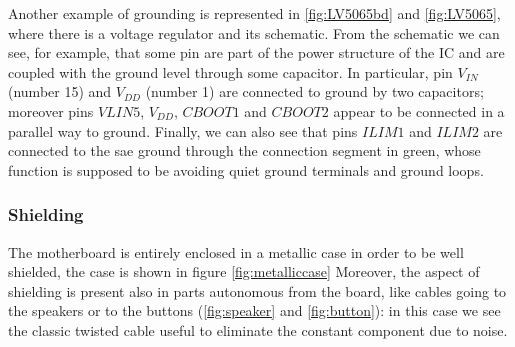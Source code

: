 \documentclass[11pt,a4paper,titlepage]{article}
\begin{document}
      Another example of grounding is represented in \autoref{fig:LV5065bd} and \autoref{fig:LV5065}, where there is a voltage regulator and its schematic. From the schematic we can see, for example, that some pin are part of the power structure of the IC and are coupled with the ground level through some capacitor. In particular, pin $V_{IN}$ (number 15) and $V_{DD}$ (number 1) are connected to ground by two capacitors; moreover pins $VLIN5$, $V_{DD}$, $CBOOT1$ and $CBOOT2$ appear to be connected in a parallel way to ground. Finally, we can also see that pins $ILIM1$ and $ILIM2$ are connected to the sae ground through the connection segment in green, whose function is supposed to be avoiding quiet ground terminals and ground loops.

      \subsubsection{Shielding}
        The motherboard is entirely enclosed in a metallic case in order to be well shielded, the case is shown in figure \autoref{fig:metalliccase} Moreover, the aspect of shielding is present also in parts autonomous from the board, like cables going to the speakers or to the buttons (\autoref{fig:speaker} and \autoref{fig:button}): in this case we see the classic twisted cable useful to eliminate the constant component due to noise.
\end{document}
